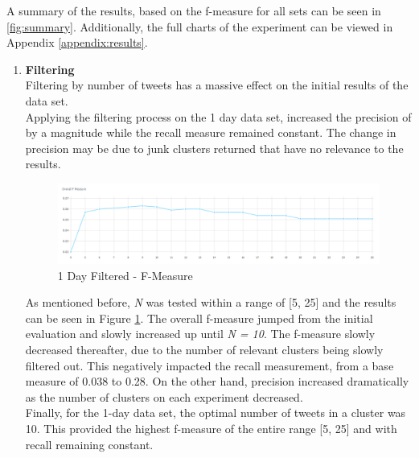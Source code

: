 \documentclass[a4paper,portrait,12pt]{article}
\begin{document}
A summary of the results, based on the f-measure for all sets can be seen in \ref{fig:summary}.
Additionally, the full charts of the experiment can be viewed in Appendix \ref{appendix:results}.

\begin{enumerate}
	\item \textbf{Filtering}\\
	      Filtering by number of tweets has a massive effect on the initial results of the data set. \\
	      Applying the filtering process on the 1 day data set, increased the precision of by a magnitude while the recall measure remained constant.
	      The change in precision may be due to junk clusters returned that have no relevance to the results.
	      \begin{figure}[h!]
		      \centering
		      \includegraphics[width=\linewidth]{images/1day-filtered-f-measure.png}
		      \caption{1 Day Filtered - F-Measure}
		      \label{fig:1day-filtered-f-measure}
	      \end{figure}

	      As mentioned before, \textit{N} was tested within a range of [5, 25] and the results can be seen in Figure \ref{fig:1day-filtered-f-measure}.
	      The overall f-measure jumped from the initial evaluation and slowly increased up until \textit{N = 10}.
	      The f-measure slowly decreased thereafter, due to the number of relevant clusters being slowly filtered out.
	      This negatively impacted the recall measurement, from a base measure of 0.038 to 0.28.
	      On the other hand, precision increased dramatically as the number of clusters on each experiment decreased.
	      \\
	      Finally, for the 1-day data set, the optimal number of tweets in a cluster was 10.
	      This provided the highest f-measure of the entire range [5, 25] and with recall remaining constant.


\end{enumerate}
\end{document}
